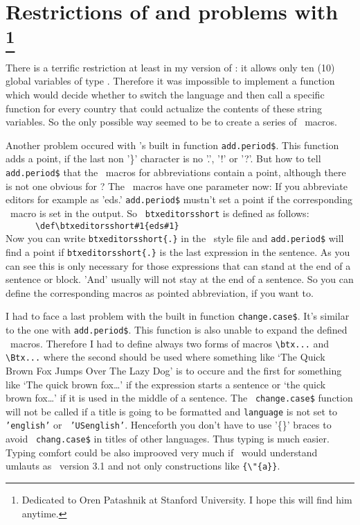 \section[Restrictions of and problems with \bibtex]{Restrictions of and 
problems with \bibtex\footnote{Dedicated to Oren Patashnik at Stanford 
University. I hope this will find him anytime.}}

There is a terrific restriction at least in my version of \bibtex: it 
allows only ten (10) global variables of type . Therefore it 
was impossible to implement a function which would decide whether to switch 
the language and then call a specific function for every country that could 
actualize the contents of these string variables. So the only possible way 
seemed to be to create a series of \tex\ macros.

Another problem occured with \bibtex's built in function 
\verb|add.period$|. This function adds a point, if the last non '\}' 
character is no '.', '!' or '?'. But how to tell \verb|add.period$| that 
the \tex\ macros for abbreviations contain a point, although there is not 
one obvious for \bibtex? The \tex\ macros have one parameter now: If you 
abbreviate editors for example as 'eds.' \verb|add.period$| mustn't set a 
point if the corresponding \tex\ macro is set in the output. So {\tt\bsl 
btxeditorsshort} is defined as follows:\\[.5ex]
\verb|      \def\btxeditorsshort#1{eds#1}|\\[.5ex]
Now you can write {\tt\bsl btxeditorsshort\{.\}} in the \bibtex\ style file 
and \verb|add.period$| will find a point if {\tt\bsl btxeditorsshort\{.\}} 
is the last expression in the sentence. As you can see this is only 
necessary for those expressions that can stand at the end of a sentence or 
block. 'And' usually will not stay at the end of a sentence. So you can 
define the corresponding macros as pointed abbreviation, if you want to.

I had to face a last problem with the built in function 
\verb|change.case$|. It's similar to the one with \verb|add.period$|.  This 
function is also unable to expand the defined \tex\ macros. Therefore I had 
to define always two forms of macros \verb|\btx...| and \verb|\Btx...| 
where the second should be used where something like `The Quick Brown Fox 
Jumps Over The Lazy Dog' is to occure and the first for something like `The 
quick brown fox\ldots' if the expression starts a sentence or `the quick 
brown fox\ldots' if it is used in the middle of a sentence. The {\tt 
change.case\$} function will not be called if a title is going to be 
formatted and {\tt language} is not set to {\tt 'english'} or {\tt 
'USenglish'}. Henceforth you don't have to use '\{\}' braces to avoid {\tt 
chang.case\$} in titles of other languages. Thus typing is much easier. 
Typing comfort could be also improoved very much if \bibtex\ would 
understand umlauts as \tex\ version 3.1 and not only constructions like 
\verb|{\"{a}}|.

